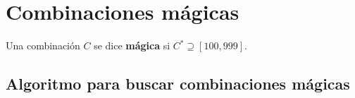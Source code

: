 \section{Combinaciones mágicas}

\begin{definition}
  Una combinación $C$ se dice \textbf{mágica} si $C^{\ast} \supseteq [100,999]$.
\end{definition}
\subsection{Algoritmo para buscar combinaciones mágicas}
